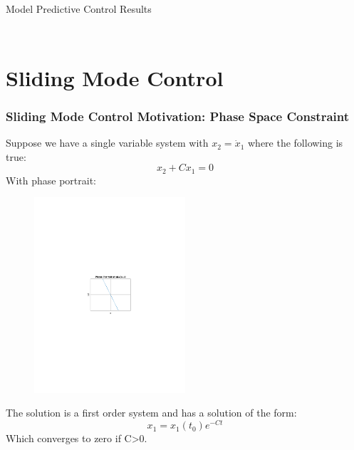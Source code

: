 \documentclass[aspectratio=169]{beamer}
\begin{document}
\begin{frame}{Model Predictive Control Results}
\begin{columns}
\begin{column}{0.5\textwidth}
\begin{figure}
            \end{figure}
        \end{column}
    \end{columns}
\end{frame}

\section{Sliding Mode Control}

\begin{frame}[t]
    \frametitle{Sliding Mode Control Motivation: Phase Space Constraint}

        Suppose we have a single variable system with $x_2=\dot{x}_1$ where the following is true: $$x_2+Cx_1=0$$ With phase portrait:
        \begin{figure}[htbp]
        \centering
        \includegraphics[trim=4.5cm 11.2cm 3cm 11cm,clip, width=0.5\textwidth]{Phase portrait.pdf}
    \end{figure}
    
    The solution is a first order system and has a solution of the form: $$x_1=x_1(t_0)e^{-Ct}$$ Which converges to zero if C>0.
\end{frame}
\end{document}
